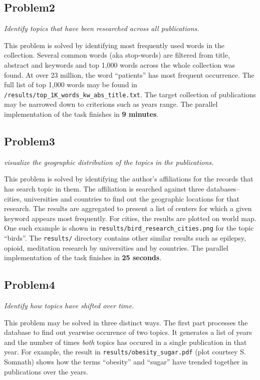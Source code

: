\documentclass{article}
\begin{document}
\subsection*{Problem2}
\textit{Identify topics that have been researched across all publications.}

This problem is solved by identifying most frequently used words in the
collection. Several common words (aka stop-words) are filtered from title,
abstract and keywords and top 1,000 words across the whole collection was
found. At over 23 million, the word ``patients'' has most frequent occurrence.
The full list of top 1,000 words may be found in
\texttt{/results/top\_1K\_words\_kw\_abs\_title.txt}. The target collection of
publications may be narrowed down to criterions such as years range.  The
parallel implementation of the task finishes in \textbf{9 minutes}.

\subsection*{Problem3}
\textit{visualize the geographic distribution of the topics in the publications.}

This problem is solved by identifying the author's affiliations for the records
that has search topic in them. The affiliation is searched against
three databases--cities, universities and countries to find out the geographic
locations for that research. The results are aggregated to present a list of
centers for which a given keyword appears most frequently. For cities, the
results are plotted on world map. One such example is shown in
\texttt{results/bird\_research\_cities.png} for the topic ``birds''. The \texttt{results/}
directory contains other similar results such as epilepsy, opioid,
meditation research by universities and by countries. The parallel
implementation of the task finishes in \textbf{25 seconds}.

\subsection*{Problem4}
\textit{Identify how topics have shifted over time.}

This problem may be solved in three distinct ways. The first part processes the
database to find out yearwise occurence of two topics. It generates a
list of years and the number of times \textit{both} topics has occured in a
single publication in that year. For example, the result in
\texttt{results/obesity\_sugar.pdf} (plot courtsey S.  Somnath) shows how the
terms ``obesity'' and ``sugar'' have trended together in publications over the
years.
\end{document}
